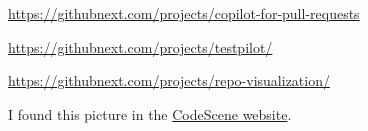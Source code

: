 \documentclass{article}
\begin{document}

\par
\url{https://githubnext.com/projects/copilot-for-pull-requests}
\plush{}

\par
\url{https://githubnext.com/projects/testpilot/}
\plush{}

\par
\url{https://githubnext.com/projects/repo-visualization/}
\plush{}

\begin{multicols}{2}
\par\columnbreak\par
I found this picture in the \href{https://codescene.com/engineering-blog/refactoring-recommendations}{CodeScene website}.
\end{multicols}
\plush{}
\end{document}
